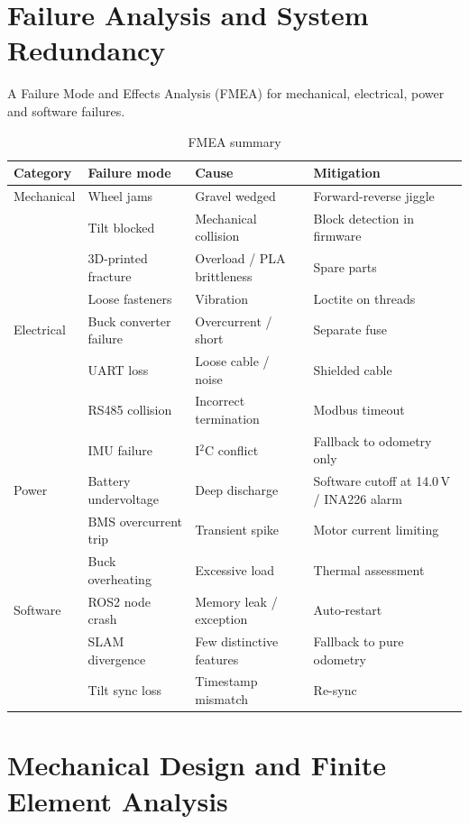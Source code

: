 \newpage
\section{Failure Analysis and System Redundancy}

A Failure Mode and Effects Analysis (FMEA) for mechanical, electrical, power and software failures.

\begin{table}[H]
\centering
\caption{FMEA summary}
\begin{tabularx}{\textwidth}{p{2.2cm} p{2.5cm} p{2.5cm} X}
\toprule
\textbf{Category} & \textbf{Failure mode} & \textbf{Cause} & \textbf{Mitigation} \\
\midrule
Mechanical & Wheel jams & Gravel wedged & Forward-reverse jiggle \\
           & Tilt blocked & Mechanical collision & Block detection in firmware \\
           & 3D-printed fracture & Overload / PLA brittleness & Spare parts \\
           & Loose fasteners & Vibration & Loctite on threads \\
\midrule
Electrical & Buck converter failure & Overcurrent / short & Separate fuse \\
           & UART loss & Loose cable / noise & Shielded cable \\
           & RS485 collision & Incorrect termination & Modbus timeout \\
           & IMU failure & I\(^2\)C conflict & Fallback to odometry only \\
\midrule
Power & Battery undervoltage & Deep discharge & Software cutoff at 14.0\,V / INA226 alarm \\
       & BMS overcurrent trip & Transient spike & Motor current limiting \\
       & Buck overheating & Excessive load & Thermal assessment \\
\midrule
Software & ROS2 node crash & Memory leak / exception & Auto-restart \\
         & SLAM divergence & Few distinctive features & Fallback to pure odometry \\
         & Tilt sync loss & Timestamp mismatch & Re-sync \\
\bottomrule
\end{tabularx}
\end{table}

\newpage

\section{Mechanical Design and Finite Element Analysis}

